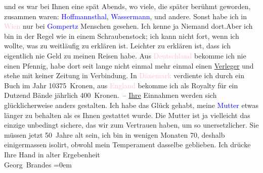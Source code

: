                     und es war bei Ihnen eine \label{K_L02040_1v}\label{K_L02040_1h} spät Abends, wo viele, die später berühmt \strikeout{\textcolor{gray}{×}\-\textcolor{gray}{×}\-\textcolor{gray}{×}} geworden, zusammen waren: \textcolor{blue}{Hoffmannsthal}{}\ledrightnote{\textcolor{blue}{Hugo von Hofmannsthal}}, \textcolor{blue}{Wassermann}{}\ledrightnote{\textcolor{blue}{Jakob Wassermann}}, und
                    andere. Sonst habe ich in \textcolor{pink}{Wien}{}\ledrightnote{\textcolor{pink}{Wien}} nur bei \textcolor{blue}{Gompertz}{}\ledrightnote{\textcolor{blue}{Theodor Gomperz}} Menschen gesehen. Ich kenne {\pb}ja Niemand dort.\hspace*{2em}Aber ich bin in der Regel wie in einem
                    Schraubenstock; ich kann nicht fort, wenn ich wollte, was zu weitläufig zu
                    erklären ist. Leichter zu erklären ist, dass ich eigentlich nie Geld zu meinen
                    Reisen habe. Aus \textcolor{pink}{Deutschland}{}\ledrightnote{\textcolor{pink}{Deutschland}} bekomme ich nie
                    einen Pfennig, habe dort seit lange nicht einmal mehr einmal einen \uline{Verleger} und stehe mit keiner Zeitung in Verbindung.
                    In \textcolor{pink}{Dänemark}{}\ledrightnote{\textcolor{pink}{Dänemark}} verdiente ich durch ein Buch im
                    Jahr 10375 Kronen, aus \textcolor{pink}{England}{}\ledrightnote{\textcolor{pink}{England}} bekomme ich als
                    Royalty für ein Dutzend Bände jährlich 400 Kronen. – \uline{Ihre} Einnahmen werden sich glücklicherweise anders gestalten.\pend
           \pstart
           Ich habe das Glück gehabt, meine \textcolor{blue}{Mutter}{} etwas länger zu behalten als es Ihnen gestattet wurde. Die
                    Mutter ist ja vielleicht das einzige unbedingt sichere, das wir zum Vertrauen
                    haben, um so unersetzlicher. Sie müssen jetzt 50 Jahre alt sein, ich bin in
                    wenigen Monaten 70, deshalb einigermassen isolirt, obwohl mein Temperament
                    dasselbe geblieben.\pend
           \pstart
           Ich drücke Ihre Hand in alter Ergebenheit{\\[\baselineskip]}\spacefill\mbox{Georg Brandes}\pend
           \leftskip=0em{}\endnumbering{}  
      